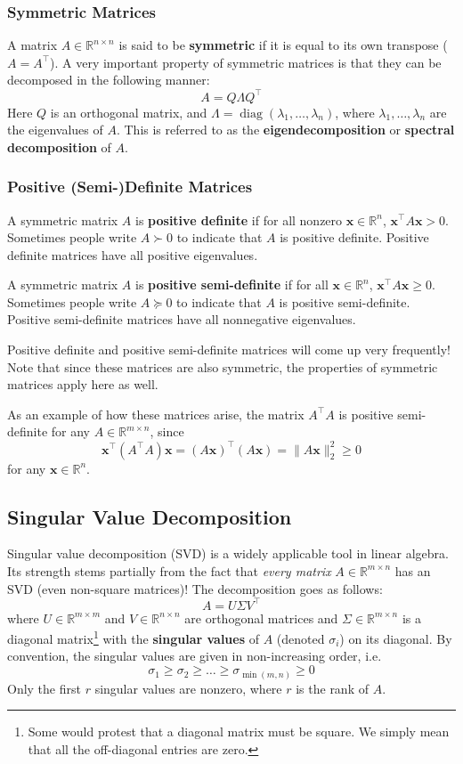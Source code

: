 \documentclass{article}
\DeclareMathOperator*{\diag}{diag}
\newcommand{\R}{\mathbb{R}}
\renewcommand{\vec}[1]{\mathbf{#1}}
\newcommand{\tran}{^\top}
\newcommand{\term}[1]{\textbf{#1}}
\begin{document}
\subsubsection{Symmetric Matrices}
A matrix $A \in \R^{n \times n}$ is said to be \term{symmetric} if it is equal to its own transpose ($A = A\tran$). A very important property of symmetric matrices is that they can be decomposed in the following manner:
\[A = Q\Lambda Q\tran\]
Here $Q$ is an orthogonal matrix, and $\Lambda = \diag(\lambda_1, \dots, \lambda_n)$, where $\lambda_1, \dots, \lambda_n$ are the eigenvalues of $A$. This is referred to as the \term{eigendecomposition} or \term{spectral decomposition} of $A$.

\subsubsection{Positive (Semi-)Definite Matrices}
A symmetric matrix $A$ is \term{positive definite} if for all nonzero $\vec{x} \in \R^n$, $\vec{x}\tran A\vec{x} > 0$. Sometimes people write $A \succ 0$ to indicate that $A$ is positive definite. Positive definite matrices have all positive eigenvalues.

A symmetric matrix $A$ is \term{positive semi-definite} if for all $\vec{x} \in \R^n$, $\vec{x}\tran A\vec{x} \geq 0$. Sometimes people write $A \succeq 0$ to indicate that $A$ is positive semi-definite. Positive semi-definite matrices have all nonnegative eigenvalues.

Positive definite and positive semi-definite matrices will come up very frequently! Note that since these matrices are also symmetric, the properties of symmetric matrices apply here as well.

As an example of how these matrices arise, the matrix $A\tran A$ is positive semi-definite for any $A \in \R^{m \times n}$, since
\[\vec{x}\tran (A\tran A)\vec{x} = (A\vec{x})\tran(A\vec{x}) = \|A\vec{x}\|_2^2 \geq 0\]
for any $\vec{x} \in \R^n$.

\subsection{Singular Value Decomposition}
Singular value decomposition (SVD) is a widely applicable tool in linear algebra. Its strength stems partially from the fact that \textit{every matrix} $A \in \R^{m \times n}$ has an SVD (even non-square matrices)! The decomposition goes as follows:
\[A = U\Sigma V\tran\]
where $U \in \R^{m \times m}$ and $V \in \R^{n \times n}$ are orthogonal matrices and $\Sigma \in \R^{m \times n}$ is a diagonal matrix\footnote{Some would protest that a diagonal matrix must be square. We simply mean that all the off-diagonal entries are zero.} with the \term{singular values} of $A$ (denoted $\sigma_i$) on its diagonal. By convention, the singular values are given in non-increasing order, i.e.
\[\sigma_1 \geq \sigma_2 \geq \dots \geq \sigma_{\min(m,n)} \geq 0\]
Only the first $r$ singular values are nonzero, where $r$ is the rank of $A$.
\end{document}
